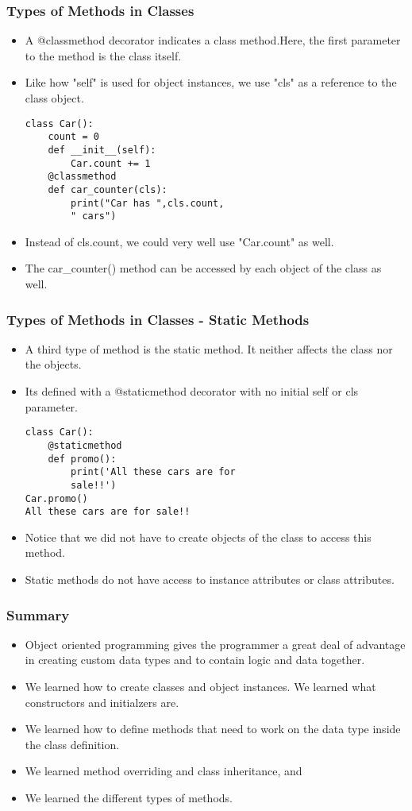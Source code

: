 \documentclass{beamer}
\begin{document}
\begin{frame}[fragile]
\frametitle{Types of Methods in Classes}
\begin{itemize}
\item A @classmethod decorator indicates a class method.Here, the first parameter to the method is the class itself.
\item Like how "self" is used for object instances, we use "cls" as a reference to the class object.
\begin{lstlisting}
class Car():
	count = 0
	def __init__(self):
		Car.count += 1
	@classmethod
	def car_counter(cls):
		print("Car has ",cls.count, 
		" cars")       
\end{lstlisting}
\item Instead of cls.count, we could very well use "Car.count" as well.
\item The car\_counter() method can be accessed by each object of the class as well.
\end{itemize}
\end{frame}

\begin{frame}[fragile]
\frametitle{Types of Methods in Classes - Static Methods}
\begin{itemize}
\item A third type of method is the static  method. It neither affects the class nor the objects.
\item Its defined with a @staticmethod decorator with no initial self or cls parameter.
\begin{lstlisting}
class Car():
	@staticmethod
	def promo():
		print('All these cars are for 
		sale!!')
Car.promo()
All these cars are for sale!!
\end{lstlisting}
\item Notice that we did not have to create objects of the class to access this method.
\item Static methods do not have access to instance attributes or class attributes.
\end{itemize}
\end{frame}

\begin{frame}
\frametitle{Summary}
\begin{itemize}
\item Object oriented programming gives the programmer a great deal of advantage in creating custom data types and to contain logic and data together.
\item We learned how to create classes and object instances. We learned what constructors and initialzers are.
\item We learned how to define methods that need to work on the data type inside the class definition.
\item We learned method overriding and class inheritance, and
\item We learned the different types  of methods.
\end{itemize}
\end{frame}
\end{document}
